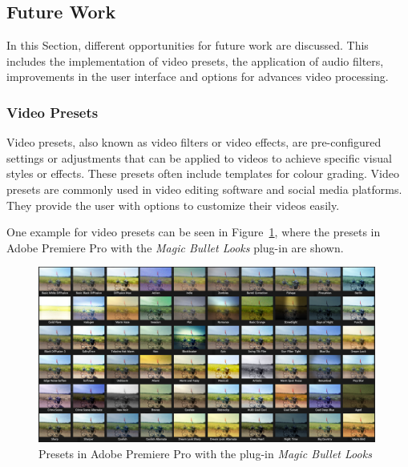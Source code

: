 \documentclass[../MasterThesis.tex]{subfiles}
\begin{document}
	


	

	
	
	
	





\subsection{Future Work} \label{subsection:futurework}


In this Section, different opportunities for future work are discussed. This includes the implementation of video presets, the application of audio filters, improvements in the user interface and options for advances video processing.


\subsubsection*{Video Presets}

Video presets, also known as video filters or video effects, are pre-configured settings or adjustments that can be applied to videos to achieve specific visual styles or effects. 
These presets often include templates for colour grading. 
Video presets are commonly used in video editing software and social media platforms. They provide the user with options to customize their videos easily. 

One example for video presets can be seen in Figure~\ref{figure:app}, where the presets in Adobe Premiere Pro with the \textit{Magic Bullet Looks} plug-in are shown.~\cite{premierepro, magicbullet}

\begin{figure}[H]
	
	\centering
	
	\includegraphics[width=0.99\textwidth]{app.png}
	
	\caption[Presets in Adobe Premiere Pro (\textit{Magic Bullet Looks})]{Presets in Adobe Premiere Pro with the plug-in \textit{Magic Bullet Looks}~\cite{premierepro, magicbullet}}
	\label{figure:app}
	
\end{figure}
\end{document}
